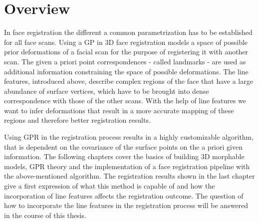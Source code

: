\section{Overview}
In face registration the different a common parametrization has to be established for all face scans. Using a GP in 3D face registration models a space of possible prior
deformations of a facial scan for the purpose of registering it with another scan. The given a priori point correspondences - called landmarks - are used as additional information constraining the space of possible deformations. The line features, introduced above, describe complex regions of the face that have a large abundance of surface vertices, which have to be brought into dense correspondence with those of the other scans. With the help of line features we want to infer
deformations that result in a more accurate mapping of these regions and therefore better
registration results. \begin{comment}As GPR is an inference technique we can further directly derive the optimization.\end{comment}
Using GPR in the registration process results in a highly customizable algorithm, that is  dependent on the covariance of the surface points on the a priori given information. 
The following chapters cover the basics of building 3D morphable models, GPR theory and the implementation of a face registration
pipeline with the above-mentioned algorithm. The registration results shown in the last chapter give a first expression of what this method is capable of and how the incorporation of line features affects the registration outcome. 
The question of how to incorporate the line features in the registration process will be answered in the course of this thesis.

\begin{comment}
One of the major questions beforehand was how to incorporate 
One of the major problems was how to use line features in a way that they could be used by the algorithm to further constrain the space of admissible deformations.
How to incorporate information of the 2D line features into the Gaussian Process?

start with idea of how thesis will be structured. What will be covered in each subsequent chapter?
start broad, explain purpose of thesis
talk about specific things related to your niche
something unexpected
why does work matter? to help justify own work
best work in the field, what gaps of knowledge remain? Brian ambergs registration method is not set in general theory, GPR is
conclusion, but set up sense of anticipation
summarise general principles, state problem or question that needs an answer and give quick hint how following chapters will help to answer question

Registration is the method of making data from different measurements or even sources comparable by applying a transformation. It has many applications, for example in computer vision and medically imaging.
\end{comment}

